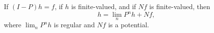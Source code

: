 If $(I - P)h = f$, if $h$ is finite-valued, and if $Nf$ is finite-valued, then
$$h = \lim_n P^n h + Nf,$$
where $\lim_n P^n h$ is regular and $Nf$ is a potential.
